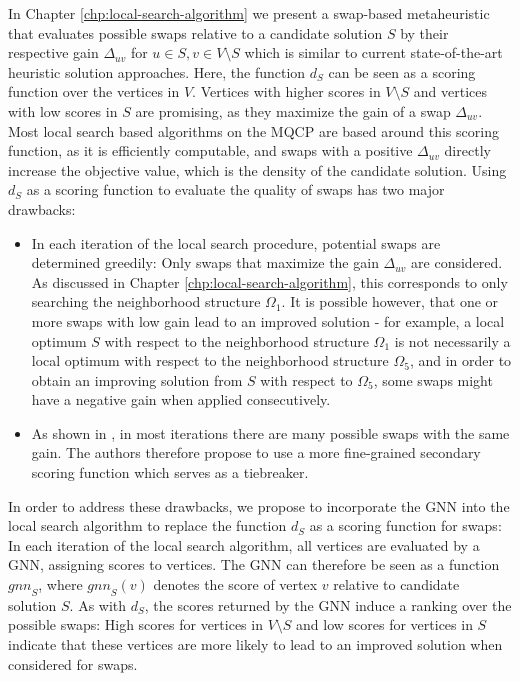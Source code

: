 \documentclass[draft,final]{vutinfth} %
\begin{document}
In Chapter \ref{chp:local-search-algorithm} we present a swap-based metaheuristic that evaluates possible swaps relative to a candidate solution $S$ by their respective gain $\Delta_{uv}$ for $u \in S, v \in V \setminus S$ which is similar to current state-of-the-art heuristic solution approaches. 
Here, the function $d_S$ can be seen as a scoring function over the vertices in $V$. Vertices with higher scores in $V \setminus S$ and vertices with low scores in $S$ are promising, as they maximize the gain of a swap $\Delta_{uv}$. 
Most local search based algorithms on the MQCP are based around this scoring function, as it is efficiently computable, and swaps with a positive $\Delta_{uv}$ directly increase the objective value, which is the density of the candidate solution. 
Using $d_S$ as a scoring function to evaluate the quality of swaps has two major drawbacks:
\begin{itemize}
    \item In each iteration of the local search procedure, potential swaps are determined greedily: Only swaps that maximize the gain $\Delta_{uv}$ are considered. As discussed in Chapter \ref{chp:local-search-algorithm}, this corresponds to only searching the neighborhood structure $\Omega_1$. It is possible however, that one or more swaps with low gain lead to an improved solution - for example, a local optimum $S$ with respect to the neighborhood structure $\Omega_1$ is not necessarily a local optimum with respect to the neighborhood structure $\Omega_5$, and in order to obtain an improving solution from $S$ with respect to $\Omega_5$, some swaps might have a negative gain when applied consecutively. 
    \item As shown in \cite{chen_nuqclq_2021}, in most iterations there are many possible swaps with the same gain. The authors therefore propose to use a more fine-grained secondary scoring function which serves as a tiebreaker. 
\end{itemize}

In order to address these drawbacks, we propose to incorporate the GNN into the local search algorithm to replace the function $d_S$ as a scoring function for swaps: In each iteration of the local search algorithm, all vertices are evaluated by a GNN, assigning scores to vertices. The GNN can therefore be seen as a function $\mathit{gnn}_S$, where $\mathit{gnn}_S(v)$ denotes the score of vertex $v$ relative to candidate solution $S$. 
As with $d_S$, the scores returned by the GNN induce a ranking over the possible swaps: High scores for vertices in $V \setminus S$ and low scores for vertices in $S$ indicate that these vertices are more likely to lead to an improved solution when considered for swaps. 
\end{document}
